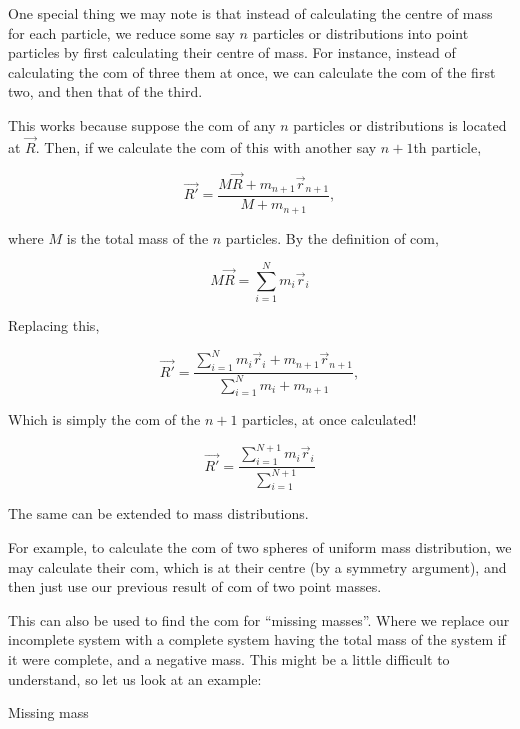 One special thing we may note is that instead of calculating the centre of mass 
for each particle, we reduce some say \(n\) particles or distributions into 
point particles by first calculating their centre of mass. For instance,
instead of calculating the com of three them at once, we 
can calculate the com of the first two, and then that of the third.

This works because suppose the com of any \(n\) particles or distributions is located at 
\(\Vec{R}\). Then, if we calculate the com of this with another say \(n+1\)th particle, 

\begin{equation*}
    \Vec{R'} = \frac{M\Vec{R} + m_{n+1}\vec{r}_{n+1}}{M + m_{n+1}},
\end{equation*}

where \(M\) is the total mass of the \(n\) particles. By the definition of com, 

\begin{equation*}
    M\Vec{R} = \sum^N_{i=1} m_i\vec{r}_i
\end{equation*}

Replacing this, 

\begin{equation*}
    \Vec{R'} = \frac{\sum^N_{i=1} m_i\vec{r}_i + m_{n+1}\vec{r}_{n+1}}{\sum_{i=1}^N m_i + m_{n+1}},
\end{equation*}

Which is simply the com of the \(n+1\) particles, at once calculated!

\begin{equation*}
    \Vec{R'} = \frac{\sum^{N+1}_{i=1} m_i\vec{r}_i}{\sum_{i=1}^{N+1}}
\end{equation*}

The same can be extended to mass distributions.

For example, to calculate the com of two spheres of uniform mass distribution, 
we may calculate their com, which is at their centre (by a symmetry argument), and then just 
use our previous result of com of two point masses.

This can also be used to find the com for ``missing masses''. Where we replace 
our incomplete system with a complete system having the total mass of the system 
if it were complete, and a negative mass. This might be a little difficult 
to understand, so let us look at an example:


\begin{marginfigure}
    \centering
    \caption{Missing mass}\label{fig: missingmasscom}
\end{marginfigure}

